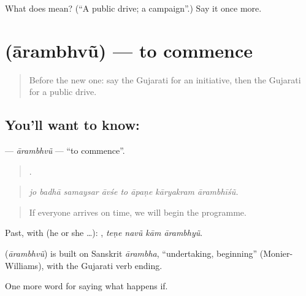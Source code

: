 \begin{tcolorbox}[breakable,colback=teal!4,colframe=teal!35!black,title={Before you move on}]
What does  mean? (\textquotedblleft{}A public drive; a campaign\textquotedblright{}.) Say it once more.
\end{tcolorbox}
\section[\texorpdfstring{\gu{આરંભવું} (ārambhvũ)}{આરંભવું (ārambhvũ)}]{ (ārambhvũ) — to commence}

\label{lesson:GU-C388-arambhvu}



\begin{quote}
Before the new one: say the Gujarati for an initiative, then the Gujarati for a public drive.
\end{quote}

\subsection*{You'll want to know: }
\textbf{} — \emph{ārambhvũ} — \textquotedblleft{}to commence\textquotedblright{}.

\begin{quote}
       .
\end{quote}

\begin{quote}
\emph{jo badhā samaysar āvśe to āpaṇe kāryakram ārambhīśũ.}
\end{quote}

\begin{quote}
If everyone arrives on time, we will begin the programme.
\end{quote}

Past, with  (he or she …):    , \emph{teṇe navũ kām ārambhyũ}.

\begin{cousinweb}
\textbf{} (\emph{ārambhvũ}) is built on Sanskrit \emph{ārambha}, \textquotedblleft{}undertaking, beginning\textquotedblright{} (Monier-Williams), with the Gujarati verb ending.
\end{cousinweb}

\begin{grammarlens}[title={What you've built}]
One more word for saying what happens if.
\end{grammarlens}

